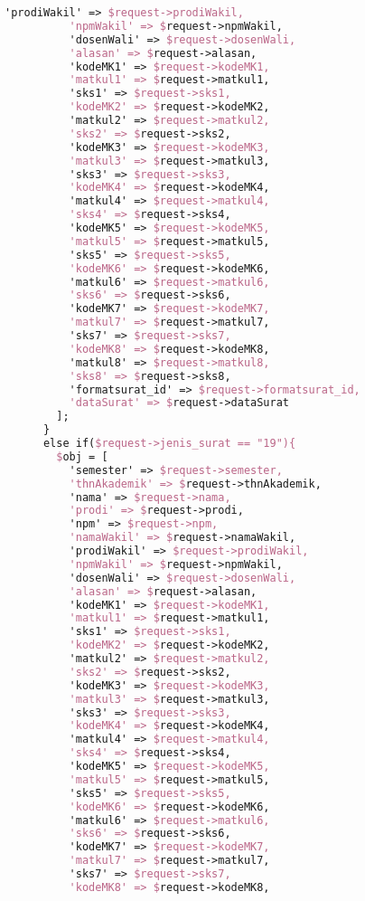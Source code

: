 \begin{lstlisting}[language=tex,basicstyle=\tiny,caption=PesanansuratController.php]
          'prodiWakil' => $request->prodiWakil,
          'npmWakil' => $request->npmWakil,
          'dosenWali' => $request->dosenWali,
          'alasan' => $request->alasan,
          'kodeMK1' => $request->kodeMK1,
          'matkul1' => $request->matkul1,
          'sks1' => $request->sks1,
          'kodeMK2' => $request->kodeMK2,
          'matkul2' => $request->matkul2,
          'sks2' => $request->sks2,
          'kodeMK3' => $request->kodeMK3,
          'matkul3' => $request->matkul3,
          'sks3' => $request->sks3,
          'kodeMK4' => $request->kodeMK4,
          'matkul4' => $request->matkul4,
          'sks4' => $request->sks4,
          'kodeMK5' => $request->kodeMK5,
          'matkul5' => $request->matkul5,
          'sks5' => $request->sks5,
          'kodeMK6' => $request->kodeMK6,
          'matkul6' => $request->matkul6,
          'sks6' => $request->sks6,
          'kodeMK7' => $request->kodeMK7,
          'matkul7' => $request->matkul7,
          'sks7' => $request->sks7,
          'kodeMK8' => $request->kodeMK8,
          'matkul8' => $request->matkul8,
          'sks8' => $request->sks8,
          'formatsurat_id' => $request->formatsurat_id,
          'dataSurat' => $request->dataSurat
        ];
      }
      else if($request->jenis_surat == "19"){
        $obj = [
          'semester' => $request->semester,
          'thnAkademik' => $request->thnAkademik,
          'nama' => $request->nama,
          'prodi' => $request->prodi,
          'npm' => $request->npm,
          'namaWakil' => $request->namaWakil,
          'prodiWakil' => $request->prodiWakil,
          'npmWakil' => $request->npmWakil,
          'dosenWali' => $request->dosenWali,
          'alasan' => $request->alasan,
          'kodeMK1' => $request->kodeMK1,
          'matkul1' => $request->matkul1,
          'sks1' => $request->sks1,
          'kodeMK2' => $request->kodeMK2,
          'matkul2' => $request->matkul2,
          'sks2' => $request->sks2,
          'kodeMK3' => $request->kodeMK3,
          'matkul3' => $request->matkul3,
          'sks3' => $request->sks3,
          'kodeMK4' => $request->kodeMK4,
          'matkul4' => $request->matkul4,
          'sks4' => $request->sks4,
          'kodeMK5' => $request->kodeMK5,
          'matkul5' => $request->matkul5,
          'sks5' => $request->sks5,
          'kodeMK6' => $request->kodeMK6,
          'matkul6' => $request->matkul6,
          'sks6' => $request->sks6,
          'kodeMK7' => $request->kodeMK7,
          'matkul7' => $request->matkul7,
          'sks7' => $request->sks7,
          'kodeMK8' => $request->kodeMK8,

\end{lstlisting}
